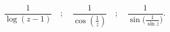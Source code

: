 

\[ \frac{1}{\log(z - 1)} \quad;\quad \frac{1}{\cos(\frac{1}{z})}
\quad;\quad \frac{1}{\sin\biggr( \frac{1}{\sin z} \biggr)}. \]
